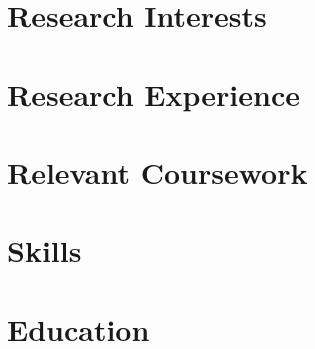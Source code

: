 \documentclass{prometheus_cv}
\begin{document}
\thispagestyle{empty}					%

\vspace*{-0.2 cm}
\centering\hspace*{-5.5cm}




\section{\textcolor{goog}{Research Interests}}

\vspace*{-0.6 cm}
\section{\textcolor{goog}{Research Experience}}


\vspace*{2 cm}
\section{\textcolor{goog}{Relevant Coursework}}



\vspace*{-0.3 cm}
\section{\textcolor{goog}{Skills}}

\vspace*{-0.2cm}
\section{\textcolor{goog}{Education}}

\end{document}
